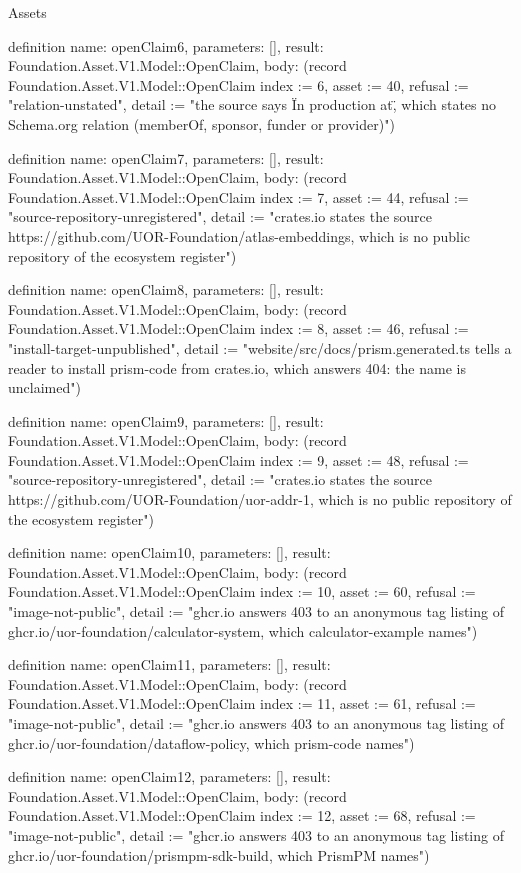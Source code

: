 \begin{lexlean}{Assets}
\begin{semanticmodule}
definition{
  name: openClaim6,
  parameters: [],
  result: Foundation.Asset.V1.Model::OpenClaim,
  body: (record Foundation.Asset.V1.Model::OpenClaim {index := 6, asset := 40, refusal := "relation-unstated", detail := "the source says \"In production at\", which states no Schema.org relation (memberOf, sponsor, funder or provider)"})
}

definition{
  name: openClaim7,
  parameters: [],
  result: Foundation.Asset.V1.Model::OpenClaim,
  body: (record Foundation.Asset.V1.Model::OpenClaim {index := 7, asset := 44, refusal := "source-repository-unregistered", detail := "crates.io states the source https://github.com/UOR-Foundation/atlas-embeddings, which is no public repository of the ecosystem register"})
}

definition{
  name: openClaim8,
  parameters: [],
  result: Foundation.Asset.V1.Model::OpenClaim,
  body: (record Foundation.Asset.V1.Model::OpenClaim {index := 8, asset := 46, refusal := "install-target-unpublished", detail := "website/src/docs/prism.generated.ts tells a reader to install prism-code from crates.io, which answers 404: the name is unclaimed"})
}

definition{
  name: openClaim9,
  parameters: [],
  result: Foundation.Asset.V1.Model::OpenClaim,
  body: (record Foundation.Asset.V1.Model::OpenClaim {index := 9, asset := 48, refusal := "source-repository-unregistered", detail := "crates.io states the source https://github.com/UOR-Foundation/uor-addr-1, which is no public repository of the ecosystem register"})
}

definition{
  name: openClaim10,
  parameters: [],
  result: Foundation.Asset.V1.Model::OpenClaim,
  body: (record Foundation.Asset.V1.Model::OpenClaim {index := 10, asset := 60, refusal := "image-not-public", detail := "ghcr.io answers 403 to an anonymous tag listing of ghcr.io/uor-foundation/calculator-system, which calculator-example names"})
}

definition{
  name: openClaim11,
  parameters: [],
  result: Foundation.Asset.V1.Model::OpenClaim,
  body: (record Foundation.Asset.V1.Model::OpenClaim {index := 11, asset := 61, refusal := "image-not-public", detail := "ghcr.io answers 403 to an anonymous tag listing of ghcr.io/uor-foundation/dataflow-policy, which prism-code names"})
}

definition{
  name: openClaim12,
  parameters: [],
  result: Foundation.Asset.V1.Model::OpenClaim,
  body: (record Foundation.Asset.V1.Model::OpenClaim {index := 12, asset := 68, refusal := "image-not-public", detail := "ghcr.io answers 403 to an anonymous tag listing of ghcr.io/uor-foundation/prismpm-sdk-build, which PrismPM names"})
}


\end{semanticmodule}
\end{lexlean}
